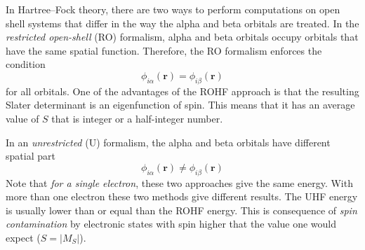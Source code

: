 \documentclass[../Main/notes.tex]{subfiles}
\begin{document}
In Hartree--Fock theory, there are two ways to perform computations on open shell systems that differ in the way the alpha and beta orbitals are treated.
In the \emph{restricted open-shell} (RO) formalism, alpha and beta orbitals occupy orbitals that have the same spatial function. Therefore, the RO formalism enforces the condition
\begin{equation}
\phi_{i\alpha}(\mathbf{r}) = \phi_{i\beta}(\mathbf{r})
\end{equation}
for all orbitals.
One of the advantages of the ROHF approach is that the resulting Slater determinant is an eigenfunction of spin.
This means that it has an average value of $S$ that is integer or a half-integer number.

In an \emph{unrestricted} (U) formalism, the alpha and beta orbitals have different spatial part
\begin{equation}
\phi_{i\alpha}(\mathbf{r}) \neq \phi_{i\beta}(\mathbf{r})
\end{equation}
Note that \emph{for a single electron}, these two approaches give the same energy.
With more than one electron these two methods give different results.
The UHF energy is usually lower than or equal than the ROHF energy.
This is consequence of \emph{spin contamination} by electronic states with spin higher that the value one would expect ($S = |M_S|$).



\end{document}
